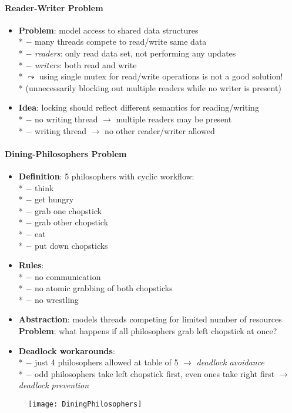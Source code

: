 \paragraph{Reader-Writer Problem}
\begin{itemize}
  \item \textbf{Problem}: model access to shared data structures \\*
    $ - $ many threads compete to read/write same data \\*
    $ - $ \emph{readers}: only read data set, not performing any updates \\*
    $ - $ \emph{writers}: both read and write \\*
    $ \leadsto $ using single mutex for read/write operations is not a good solution! \\*
    \phantom{$ \leadsto $} (unnecessarily blocking out multiple readers while no writer is present)
  \item \textbf{Idea}: locking should reflect different semantics for reading/writing \\*
  $ - $ no writing thread $ \to $ multiple readers may be present \\*
  $ - $ writing thread $ \to $ no other reader/writer allowed
\end{itemize}

\paragraph{Dining-Philosophers Problem}
\begin{itemize}
  \item \textbf{Definition}: 5 philosophers with cyclic workflow: \\*
    $ - $ think \\*
    $ - $ get hungry \\*
    $ - $ grab one chopstick \\*
    $ - $ grab other chopstick \\*
    $ - $ eat \\*
    $ - $ put down chopsticks
  \item \textbf{Rules}: \\*
    $ - $ no communication \\*
    $ - $ no atomic grabbing of both chopsticks \\*
    $ - $ no wrestling
  \item \textbf{Abstraction}: models threads competing for limited number of resources
  \textbf{Problem}: what happens if all philosophers grab left chopstick at once?
  \item \textbf{Deadlock workarounds}:  \\*
    $ - $ just 4 philosophers allowed at table of 5 $ \to $ \emph{deadlock avoidance} \\*
    $ - $ odd philosophers take left chopstick first, even ones take right first $ \to $ \emph{deadlock prevention}
\end{itemize}
\begin{figure}[h]\centering\label{DiningPhilosophers}\texttt{[image: DiningPhilosophers]}\end{figure}

